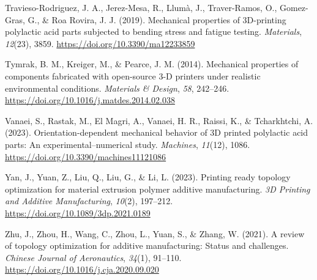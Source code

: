 Travieso-Rodriguez, J. A., Jerez-Mesa, R., Llumà, J., Traver-Ramos, O., Gomez-Gras, G., \& Roa Rovira, J. J. (2019). Mechanical properties of 3D-printing polylactic acid parts subjected to bending stress and fatigue testing. \textit{Materials}, \textit{12}(23), 3859. \url{https://doi.org/10.3390/ma12233859}\par
Tymrak, B. M., Kreiger, M., \& Pearce, J. M. (2014). Mechanical properties of components fabricated with open-source 3-D printers under realistic environmental conditions. \textit{Materials \& Design}, \textit{58}, 242–246. \url{https://doi.org/10.1016/j.matdes.2014.02.038}\par
Vanaei, S., Rastak, M., El Magri, A., Vanaei, H. R., Raissi, K., \& Tcharkhtchi, A. (2023). Orientation-dependent mechanical behavior of 3D printed polylactic acid parts: An experimental–numerical study. \textit{Machines}, \textit{11}(12), 1086. \url{https://doi.org/10.3390/machines11121086}\par
Yan, J., Yuan, Z., Liu, Q., Liu, G., \& Li, L. (2023). Printing ready topology optimization for material extrusion polymer additive manufacturing. \textit{3D Printing and Additive Manufacturing}, \textit{10}(2), 197–212. \url{https://doi.org/10.1089/3dp.2021.0189}\par
Zhu, J., Zhou, H., Wang, C., Zhou, L., Yuan, S., \& Zhang, W. (2021). A review of topology optimization for additive manufacturing: Status and challenges. \textit{Chinese Journal of Aeronautics}, \textit{34}(1), 91–110. \url{https://doi.org/10.1016/j.cja.2020.09.020}\par
